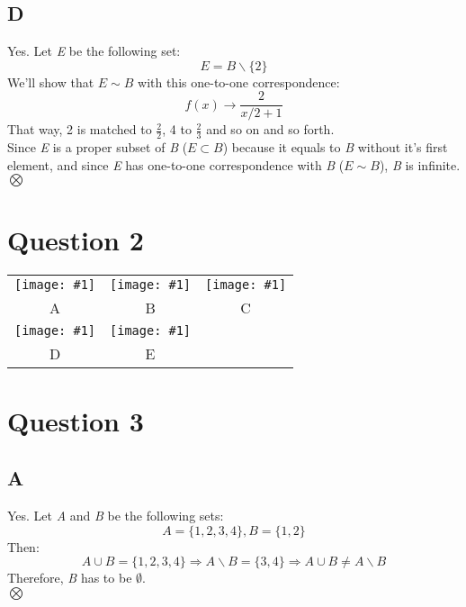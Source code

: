 \documentclass[12pt, oneside]{article}
\newcommand{\img}[1] {
	\texttt{[image: \#1]}
}
\begin{document}
\subsection{D}
Yes. Let \emph{E} be the following set:
\begin{equation*}
E = B\backslash\{2\}
\end{equation*}
We'll show that $E \sim B$ with this one-to-one correspondence:
\begin{equation*}
f(x) \rightarrow \frac{2}{x/2+1}
\end{equation*}
That way, 2 is matched to $\frac{2}{2}$, 4 to $\frac{2}{3}$ and so on and so forth.\\
Since \emph{E} is a proper subset of \emph{B} ($E \subset B$) because it equals to \emph{B} without it's first element, and since \emph{E} has one-to-one correspondence with \emph{B} ($E \sim B$), \emph{B} is infinite.\\
$\bigotimes$

\section{Question 2}
\begin{center}
\begin{tabular}{ c c c }
\img{A} & \img{B} & \img{C}\\
A & B & C\\
\img{D} & \img{E}\\
D & E\\
\end{tabular}
\end{center}

\section{Question 3}
\subsection{A}
Yes. Let \emph{A} and \emph{B} be the following sets:
\begin{equation*}
A = \{1, 2, 3, 4\}, B = \{1, 2\}
\end{equation*}
Then:
\begin{equation*}
A \cup B = \{1, 2, 3, 4\}\Rightarrow
A \backslash B = \{3, 4\}\Rightarrow
A \cup B \neq A \backslash B
\end{equation*}
Therefore, \emph{B} has to be $\emptyset$.\\
$\bigotimes$
\end{document}
